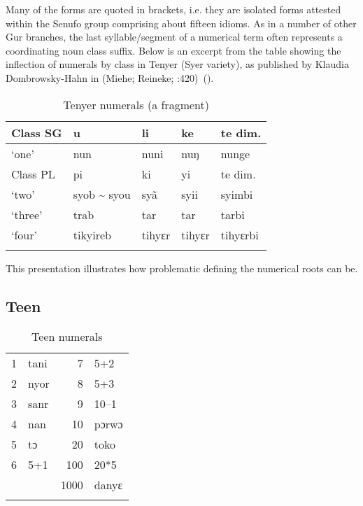 Many of the forms are quoted in brackets, i.e. they are isolated forms attested within the Senufo group comprising about fifteen idioms. As in a number of other Gur branches, the last syllable/segment of a numerical term often represents a coordinating noun class suffix. Below is an excerpt from the table showing the inflection of numerals by class in Tenyer (Syer variety), as published by Klaudia Dombrowsky-Hahn in (Miehe; Reineke; \citealt{Winkelmann2007f}:420)~().

\begin{table}
\caption{\label{tab:3:182}Tenyer numerals (a fragment)}
\begin{tabularx}{\textwidth}{lXXXl}
\lsptoprule
{Class} {SG} & {u} & {li} & {ke} & {te} {dim.}\\
\midrule
‘one’ & nun & nuni & nuŋ & nunge\\
\tablevspace
{Class} {PL} & {pi} & {ki} & {yi} & {te} {dim.}\\
\midrule
‘two’ & syob {\textasciitilde} syou & sy{\~{a}} & syii & syimbi\\
‘three’ & trab & tar & tar & tarbi\\
‘four’ & tikyireb & tihyɛr & tihyɛr & tihyɛrbi\\
\lspbottomrule
\end{tabularx}
\end{table}

  
This presentation illustrates how problematic defining the numerical roots can be.
% 

 \newpage 
\subsection{Teen}%
\begin{table}[h!]
\caption{\label{tab:3:183}Teen numerals}


\begin{tabularx}{\textwidth}{lQrX}
\lsptoprule

1 & tani & 7 & 5+2\\
2 & nyor & 8 & 5+3\\
3 & sanr & 9 & 10--1\\
4 & nan & 10 & pɔrwɔ\\
5 & tɔ & 20 & toko\\
6 & 5+1 & 100 & 20*5\\
&  & 1000 & danyɛ\\
\lspbottomrule
\end{tabularx}
\end{table}

